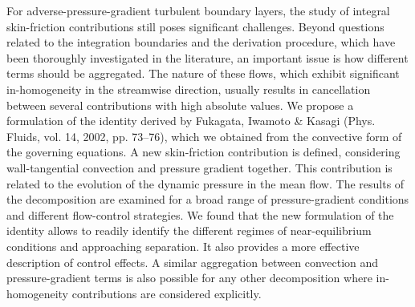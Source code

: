 \begin{paper}

\makepapertitle

%
\begin{paperabstract}
    For adverse-pressure-gradient turbulent boundary layers, the study of integral skin-friction contributions still poses significant challenges. Beyond questions related to the integration boundaries and the derivation procedure, which have been thoroughly investigated in the literature, an important issue is how different terms should be aggregated. The nature of these flows, which exhibit significant in-homogeneity in the streamwise direction, usually results in cancellation between several contributions with high absolute values. We propose a formulation of the identity derived by Fukagata, Iwamoto \& Kasagi (Phys. Fluids, vol. 14, 2002, pp. 73--76), which we obtained from the convective form of the governing equations. A new skin-friction contribution is defined, considering wall-tangential convection and pressure gradient together. This contribution is related to the evolution of the dynamic pressure in the mean flow. The results of the decomposition are examined for a broad range of pressure-gradient conditions and different flow-control strategies. We found that the new formulation of the identity allows to readily identify the different regimes of near-equilibrium conditions and approaching separation. It also provides a more effective description of control effects. A similar aggregation between convection and pressure-gradient terms is also possible for any other decomposition where in-homogeneity contributions are considered explicitly. 
\end{paperabstract}


%



%


%

\end{paper}

